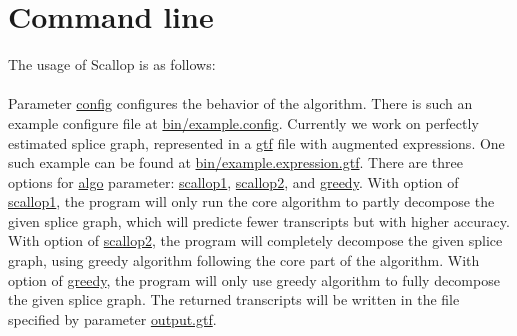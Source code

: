 \documentclass{llncs}
\begin{document}
\section{Command line}
The usage of Scallop is as follows:\\
\\
Parameter \url{config} configures the behavior of the algorithm.
There is such an example configure file at \url{bin/example.config}.
Currently we work on perfectly estimated splice graph, represented in a \url{gtf} file with
augmented expressions. One such example can be found at \url{bin/example.expression.gtf}.
There are three options for \url{algo} parameter: \url{scallop1}, \url{scallop2}, and \url{greedy}.
With option of \url{scallop1}, the program will only run the core algorithm to partly
decompose the given splice graph, which will predicte fewer transcripts but with
higher accuracy. With option of \url{scallop2}, the program will completely
decompose the given splice graph, using greedy algorithm following the core part of the algorithm.
With option of \url{greedy}, the program will only use greedy algorithm to fully decompose
the given splice graph.
The returned transcripts will be written in the file specified by parameter \url{output.gtf}.

\end{document}
